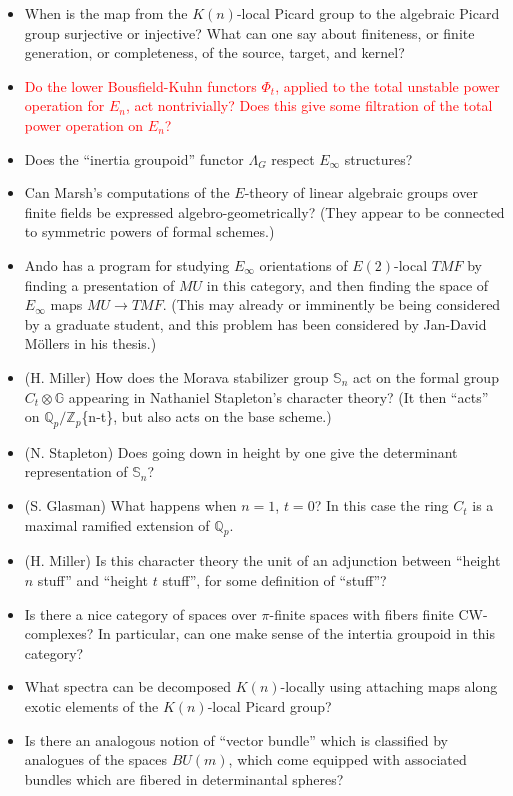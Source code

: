 \documentclass[12pt,titlepage]{article}
\newcommand{\rd}[1]{{\textcolor{red}{#1}}}
\theoremstyle{plain}
\theoremstyle{definition}
\theoremstyle{remark}
\begin{document}
\begin{itemize}%
\item When is the map from the $K(n)$-local Picard group to the algebraic Picard group surjective or injective? What can one say about finiteness, or finite generation, or completeness, of the source, target, and kernel?
\item \rd{Do the lower Bousfield-Kuhn functors $\Phi_t$, applied to the total unstable power operation for $E_n$, act nontrivially? Does this give some filtration of the total power operation on $E_n$?}
\item Does the ``{}inertia groupoid''{} functor $\Lambda_G$ respect $E_\infty$ structures?
\item Can Marsh'{}s computations of the $E$-theory of linear algebraic groups over finite fields be expressed algebro-geometrically? (They appear to be connected to symmetric powers of formal schemes.)
\item Ando has a program for studying $E_\infty$ orientations of $E(2)$-local $TMF$ by finding a presentation of $MU$ in this category, and then finding the space of $E_\infty$ maps $MU \to
TMF$. (This may already or imminently be being considered by a graduate student, and this problem has been considered by Jan-David Möllers in his thesis.)
\item (H. Miller) How does the Morava stabilizer group $\mathbb{S}_n$ act on the formal group $C_t \otimes \mathbb{G}$ appearing in Nathaniel Stapleton'{}s character theory? (It then ``{}acts''{} on $\mathbb{Q}_p/\mathbb{Z}_p${\tt {}}\{n-t\}, but also acts on the base scheme.)
\item (N. Stapleton) Does going down in height by one give the determinant representation of $\mathbb{S}_n$?
\item (S. Glasman) What happens when $n=1$, $t=0$? In this case the ring $C_t$ is a maximal ramified extension of $\mathbb{Q}_p$.
\item (H. Miller) Is this character theory the unit of an adjunction between ``{}height $n$ stuff''{} and ``{}height $t$ stuff''{}, for some definition of ``{}stuff''{}?
\item Is there a nice category of spaces over $\pi$-finite spaces with fibers finite CW-complexes? In particular, can one make sense of the intertia groupoid in this category?
\item What spectra can be decomposed $K(n)$-locally using attaching maps along exotic elements of the $K(n)$-local Picard group?
\item Is there an analogous notion of ``{}vector bundle''{} which is classified by analogues of the spaces $BU(m)$, which come equipped with associated bundles which are fibered in determinantal spheres?

\end{itemize}
\end{document}
